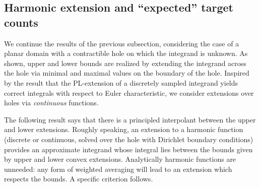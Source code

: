 \documentclass{psapm-l}
\theoremstyle{definition}
\theoremstyle{remark}
\numberwithin{equation}{section}
\begin{document}
\subsection{Harmonic extension and ``expected'' target counts}
\label{sec:harmonic}

We continue the results of the previous subsection, considering the case of a planar domain with a contractible hole on which the integrand is unknown. As shown, upper and lower bounds are realized by extending the integrand across the hole via minimal and maximal values on the boundary of the hole. Inspired by the result that the PL-extension of a discretely sampled integrand yields correct integrals with respect to Euler characteristic, we consider extensions over holes via {\em continuous} functions.

The following result says that there is a principled interpolant between the upper and lower extensions. Roughly speaking, an extension to a harmonic function (discrete or continuous, solved over the hole with Dirichlet boundary conditions) provides an approximate integrand whose integral lies between the bounds given by upper and lower convex extensions. Analytically harmonic functions are unneeded: any form of weighted averaging will lead to an extension which respects the bounds. A specific criterion follows.
\end{document}
